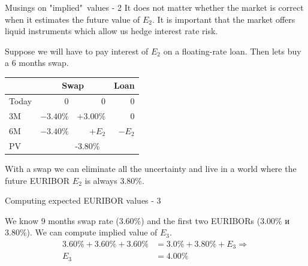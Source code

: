 \documentclass{beamer}
\begin{document}
\begin{frame}{Musings on "implied"\ values - 2}
\justify
It does not matter whether the market is correct when it estimates the future value of $E_2$. It is important that the market offers liquid instruments which allow us hedge interest rate risk.

\justify
Suppose we will have to pay interest of $E_2$ on  a floating-rate loan. Then lets buy a 6 months swap.

\centering
\begin{tabular}{l|r|r|r}
    & \multicolumn{2}{c|}{Swap} & Loan \\ \hline
Today &          0  &  0            & 0 \\
3M      & $-3.40\%$  &  $+3.00\%$   & 0 \\
6M      & $-3.40\%$  &  $+E_2$       & $-E_2$ \\ \hline
PV       & \multicolumn{3}{c}{-3.80\%}
\end{tabular}

\justify
With a swap we can eliminate all the uncertainty and live in a world where the future EURIBOR $E_2$ is always 3.80\%.
\end{frame}



\begin{frame}{Computing expected EURIBOR values - 3}
\centering
{}

\justify
We know 9 months swap rate (3.60\%) and the first two EURIBORs (3.00\% и 3.80\%). We can compute implied value of $E_3$.
\begin{align*}
3.60\% + 3.60\% + 3.60\% &= 3.0\% + 3.80\% + E_3 \Rightarrow \\
E_3 &= 4.00\%
\end{align*}
\end{frame}
\end{document}
